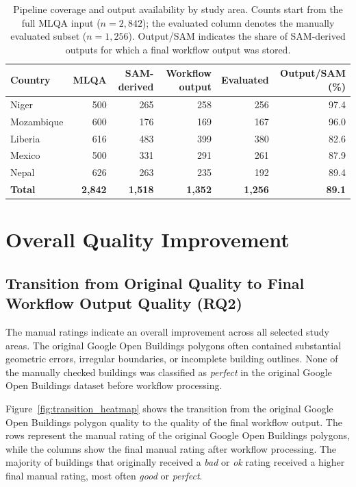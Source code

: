 \begin{table}[htb]
\centering
\caption{Pipeline coverage and output availability by study area. Counts start from the full MLQA input (\(n=2,842\)); the evaluated column denotes the manually evaluated subset (\(n=1,256\)). Output/SAM indicates the share of SAM-derived outputs for which a final workflow output was stored.}
\label{tab:pipeline_dropoff}
\begin{tabular}{lrrrrr}
\toprule
Country & MLQA & SAM-derived & Workflow output & Evaluated & Output/SAM (\%) \\
\midrule
Niger      & 500 & 265 & 258 & 256 & 97.4 \\
Mozambique & 600 & 176 & 169 & 167 & 96.0 \\
Liberia    & 616 & 483 & 399 & 380 & 82.6 \\
Mexico     & 500 & 331 & 291 & 261 & 87.9 \\
Nepal      & 626 & 263 & 235 & 192 & 89.4 \\
\midrule
\textbf{Total} & \textbf{2,842} & \textbf{1,518} & \textbf{1,352} & \textbf{1,256} & \textbf{89.1} \\
\bottomrule
\end{tabular}
\end{table}

\section{Overall Quality Improvement}

\subsection{Transition from Original Quality to Final Workflow Output Quality (RQ2)}

The manual ratings indicate an overall improvement across all selected study areas. The original Google Open Buildings polygons often contained substantial geometric errors, irregular boundaries, or incomplete building outlines. None of the manually checked buildings was classified as \textit{perfect} in the original Google Open Buildings dataset before workflow processing.

Figure~\ref{fig:transition_heatmap} shows the transition from the original Google Open Buildings polygon quality to the quality of the final workflow output. The rows represent the manual rating of the original Google Open Buildings polygons, while the columns show the final manual rating after workflow processing. The majority of buildings that originally received a \textit{bad} or \textit{ok} rating received a higher final manual rating, most often \textit{good} or \textit{perfect}.

